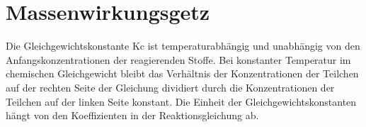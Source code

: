 
\section{Massenwirkungsgetz} \label{sec:mwg}

Die Gleichgewichtskonstante Kc ist temperaturabhängig und unabhängig von den Anfangskonzentrationen der reagierenden Stoffe. 
Bei konstanter Temperatur im chemischen Gleichgewicht bleibt das Verhältnis der Konzentrationen der Teilchen auf der rechten Seite der Gleichung dividiert durch die Konzentrationen der Teilchen auf der linken Seite konstant. 
Die Einheit der Gleichgewichtskonstanten hängt von den Koeffizienten in der Reaktionsgleichung ab.


